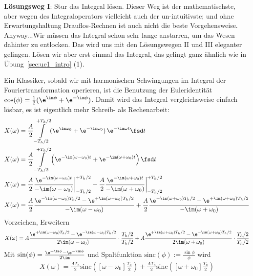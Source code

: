 %
%
%
\begin{ExCalc}
\textbf{Lösungsweg I}: Stur das Integral lösen.
Dieser Weg ist der mathematischste, aber wegen des Integraloperators vielleicht auch
der un-intuitivste; und ohne Erwartungshaltung Drauflos-Rechnen ist auch nicht die beste
Vorgehensweise. Anyway...Wir müssen das Integral schon sehr lange anstarren, um das Wesen
dahinter zu entlocken. Das wird uns mit den Lösungswegen II und III eleganter gelingen.
Lösen wir aber erst einmal das Integral, das gelingt ganz ähnlich wie in Übung~\ref{sec:ue1_intro} (1).

Ein Klassiker, sobald wir mit harmonischen Schwingungen im Integral
der Fouriertransformation operieren, ist die Benutzung der Euleridentität
$\cos(\phi) = \frac{1}{2}(\e^{\im \phi} + \e^{-\im \phi})$.
Damit wird das Integral vergleichsweise einfach lösbar, es ist eigentlich mehr
Schreib- als Rechenarbeit:
\begin{align}
&X(\omega) = \frac{A}{2} \int\limits_{-T_h/2}^{+T_h/2} (\e^{\im \omega_0} + \e^{-\im \omega_0}) \, \e^{-\im \omega t} \fsd t
\\
&X(\omega) = \frac{A}{2}\int\limits_{-T_h/2}^{+T_h/2} \left(\e^{-\im (\omega-\omega_0) t} + \e^{-\im (\omega+\omega_0) t} \right) \fsd t
\\
&X(\omega) =
\frac{A}{2} \frac{\e^{-\im (\omega-\omega_0) t}}{-\im (\omega-\omega_0)}\bigg|_{-T_h/2}^{+T_h/2}
+\frac{A}{2} \frac{\e^{-\im (\omega+\omega_0) t}}{-\im (\omega+\omega_0)}\bigg|_{-T_h/2}^{+T_h/2}
\\
&X(\omega) =
\frac{A}{2} \frac{\e^{-\im (\omega-\omega_0) T_h/2} - \e^{+\im (\omega-\omega_0) T_h/2}}{-\im (\omega-\omega_0)}
+\frac{A}{2} \frac{\e^{-\im (\omega+\omega_0) T_h/2} - \e^{+\im (\omega+\omega_0) T_h/2}}{-\im (\omega+\omega_0)}
\end{align}
%
Vorzeichen, Erweitern
%
\begin{align}
X(\omega) =
A\frac{\e^{+\im (\omega-\omega_0) T_h/2} - \e^{-\im (\omega-\omega_0) T_h/2}}{2\im (\omega-\omega_0)} \cdot \frac{T_h/2}{T_h/2}
+A \frac{\e^{+\im (\omega+\omega_0) T_h/2} - \e^{-\im (\omega+\omega_0) T_h/2}}{2\im (\omega+\omega_0)} \cdot \frac{T_h/2}{T_h/2}
\end{align}
%
Mit $\sin(\phi) = \frac{\e^{+\im \phi}-\e^{-\im \phi}}{2\im}$ und Spaltfunktion
$\mathrm{sinc}(\phi):=\frac{\sin \phi}{\phi}$ wird
\begin{align}
\label{eq:610482EF57_Xjw}
X(\omega) =
\frac{A T_h}{2} \mathrm{sinc}\left([\omega-\omega_0] \frac{T_h}{2}\right) +
\frac{A T_h}{2} \mathrm{sinc}\left([\omega+\omega_0] \frac{T_h}{2}\right)

\end{align}
\end{ExCalc}
